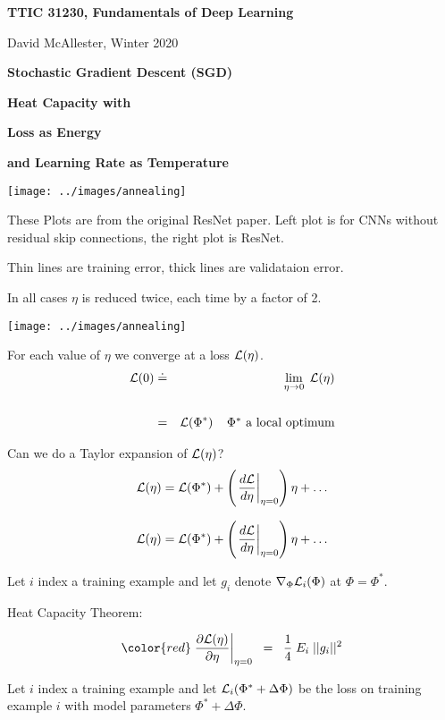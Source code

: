 




{\Huge
  \centerline{\bf TTIC 31230, Fundamentals of Deep Learning}
  \bigskip
  \centerline{David McAllester, Winter 2020}
  \vfill
  \centerline{\bf Stochastic Gradient Descent (SGD)}
  \vfill
  \centerline{\bf Heat Capacity with}
  \vfill
  \centerline{\bf Loss as Energy}
  \vfill
  \centerline{\bf and Learning Rate as Temperature}
  \vfill
  \vfill
  \vfill


\centerline{\texttt{[image: ../images/annealing]}}

\vfill
These Plots are from the original ResNet paper.  Left plot is for CNNs without residual skip connections, the right plot is ResNet.

\vfill
Thin lines are training error, thick lines are validataion error.

\vfill
In all cases $\eta$ is reduced twice, each time by a factor of 2.


\centerline{\texttt{[image: ../images/annealing]}}
For each value of $\eta$ we converge at a loss ${\cal L}(\eta)$.
\begin{eqnarray*}
{\cal L}(0) & \doteq & \lim_{\eta \rightarrow 0}\;{\cal L}(\eta) \\
\\
& = & {\cal L}(\Phi^*)\;\;\;\;\mbox{$\Phi^*$ a local optimum}
\end{eqnarray*}

\vfill
Can we do a Taylor expansion of ${\cal L}(\eta)$?
$${\cal L}(\eta) = {\cal L}(\Phi^*) + \left(\left.\frac{d{\cal L}}{d \eta}\right|_{\eta = 0}\right)\eta + \ldots$$


$${\cal L}(\eta) = {\cal L}(\Phi^*) + \left(\left.\frac{d{\cal L}}{d \eta}\right|_{\eta = 0}\right)\eta + \ldots$$

\vfill
Let $i$ index a training example and let $g_i$ denote $\nabla_\Phi {\cal L}_i(\Phi)$ at $\Phi = \Phi^*$.

\vfill
Heat Capacity Theorem:

\vfill
$${\color{red} \left.\frac{\partial {\cal L}(\eta)}{\partial \eta}\right|_{\eta = 0} \;\;=\;\; \frac{1}{4}\; E_i\; ||g_i||^2}$$


\vfill
Let $i$ index a training example and let ${\cal L}_i(\Phi^* + \Delta \Phi)$ be the loss on training example $i$
with model parameters $\Phi^* + \Delta\Phi$. 

}
